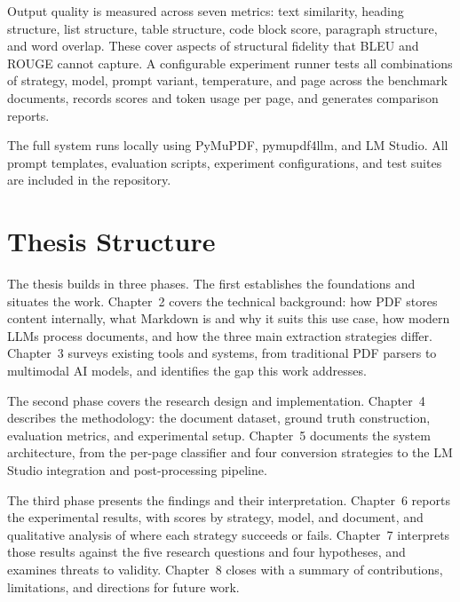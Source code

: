 Output quality is measured across seven metrics: text similarity, heading
structure, list structure, table structure, code block score, paragraph
structure, and word overlap. These cover aspects of structural fidelity that
BLEU and ROUGE cannot capture. A configurable experiment runner tests all
combinations of strategy, model, prompt variant, temperature, and page across
the benchmark documents, records scores and token usage per page, and generates
comparison reports.

The full system runs locally using PyMuPDF, pymupdf4llm, and LM Studio. All
prompt templates, evaluation scripts, experiment configurations, and test
suites are included in the repository.

\section{Thesis Structure}

The thesis builds in three phases. The first establishes the foundations and
situates the work. Chapter~2 covers the technical background: how PDF stores
content internally, what Markdown is and why it suits this use case, how
modern LLMs process documents, and how the three main extraction strategies
differ. Chapter~3 surveys existing tools and systems, from traditional PDF
parsers to multimodal AI models, and identifies the gap this work addresses.

The second phase covers the research design and implementation. Chapter~4
describes the methodology: the document dataset, ground truth construction,
evaluation metrics, and experimental setup. Chapter~5 documents the system
architecture, from the per-page classifier and four conversion strategies to
the LM Studio integration and post-processing pipeline.

The third phase presents the findings and their interpretation. Chapter~6
reports the experimental results, with scores by strategy, model, and
document, and qualitative analysis of where each strategy succeeds or fails.
Chapter~7 interprets those results against the five research questions and
four hypotheses, and examines threats to validity. Chapter~8 closes with a
summary of contributions, limitations, and directions for future work.
